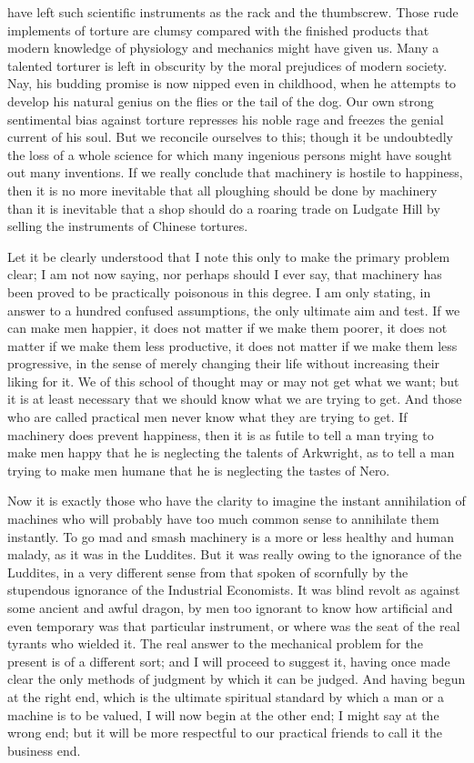 \documentclass{book}
\begin{document}
have left such scientific instruments as the rack and the thumbscrew. Those rude implements of torture are clumsy compared with the finished products that modern knowledge of physiology and mechanics might have given us. Many a talented torturer is left in obscurity by the moral prejudices of modern society. Nay, his budding promise is now nipped even in childhood, when he attempts to develop his natural genius on the flies or the tail of the dog. Our own strong sentimental bias against torture represses his noble rage and freezes the genial current of his soul. But we reconcile ourselves to this; though it be undoubtedly the loss of a whole science for which many ingenious persons might have sought out many inventions. If we really conclude that machinery is hostile to happiness, then it is no more inevitable that all ploughing should be done by machinery than it is inevitable that a shop should do a roaring trade on Ludgate Hill by selling the instruments of Chinese tortures.

Let it be clearly understood that I note this only to make the primary problem clear; I am not now saying, nor perhaps should I ever say, that machinery has been proved to be practically poisonous in this degree. I am only stating, in answer to a hundred confused assumptions, the only ultimate aim and test. If we can make men happier, it does not matter if we make them poorer, it does not matter if we make them less productive, it does not matter if we make them less progressive, in the sense of merely changing their life without increasing their liking for it. We of this school of thought may or may not get what we want; but it is at least necessary that we should know what we are trying to get. And those who are called practical men never know what they are trying to get. If machinery does prevent happiness, then it is as futile to tell a man trying to make men happy that he is neglecting the talents of Arkwright, as to tell a man trying to make men humane that he is neglecting the tastes of Nero.

Now it is exactly those who have the clarity to imagine the instant annihilation of machines who will probably have too much common sense to annihilate them instantly. To go mad and smash machinery is a more or less healthy and human malady, as it was in the Luddites. But it was really owing to the ignorance of the Luddites, in a very different sense from that spoken of scornfully by the stupendous ignorance of the Industrial Economists. It was blind revolt as against some ancient and awful dragon, by men too ignorant to know how artificial and even temporary was that particular instrument, or where was the seat of the real tyrants who wielded it. The real answer to the mechanical problem for the present is of a different sort; and I will proceed to suggest it, having once made clear the only methods of judgment by which it can be judged. And having begun at the right end, which is the ultimate spiritual standard by which a man or a machine is to be valued, I will now begin at the other end; I might say at the wrong end; but it will be more respectful to our practical friends to call it the business end.
\end{document}
